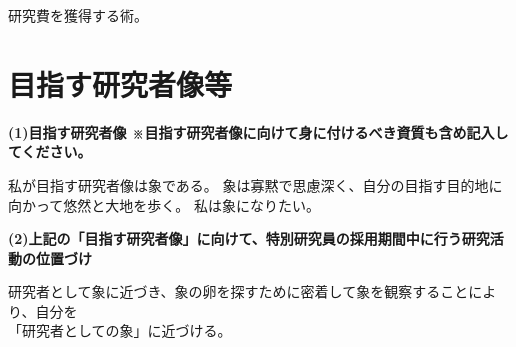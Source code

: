 \documentclass[11pt,a4j,dvipdfmx]{jarticle} 					%
\newcommand{\研究課題名}{象の卵}
\newcommand{\研究機関名}{逢坂大学}
\newcommand{\研究代表者氏名}{湯川秀樹}
\begin{document}
研究費を獲得する術。





\section{目指す研究者像等}

\noindent
\textbf{(1)目指す研究者像 {\scriptsize ※目指す研究者像に向けて身に付けるべき資質も含め記入してください。}}

私が目指す研究者像は象である。
象は寡黙で思慮深く、自分の目指す目的地に向かって悠然と大地を歩く。
私は象になりたい。

\vspace{5mm}
\noindent
\textbf{(2)上記の「目指す研究者像」に向けて、特別研究員の採用期間中に行う研究活動の位置づけ}

研究者として象に近づき、象の卵を探すために密着して象を観察することにより、自分を\\
「研究者としての象」に近づける。



\end{document}
